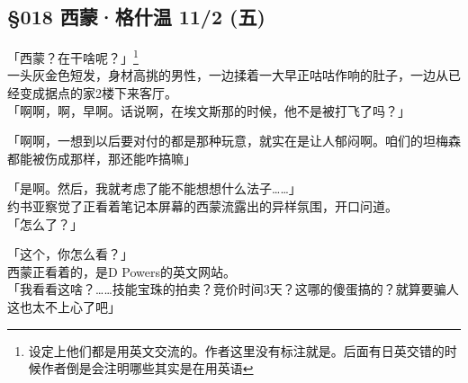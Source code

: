 \subsection{§018 西蒙·格什温 11/2 (五)}

「西蒙？在干啥呢？」\footnote{设定上他们都是用英文交流的。作者这里没有标注就是。后面有日英交错的时候作者倒是会注明哪些其实是在用英语}\\

一头灰金色短发，身材高挑的男性，一边揉着一大早正咕咕作响的肚子，一边从已经变成据点的家2楼下来客厅。\\

「啊啊，啊，早啊。话说啊，在埃文斯那的时候，他不是被打飞了吗？」

「啊啊，一想到以后要对付的都是那种玩意，就实在是让人郁闷啊。咱们的坦梅森都能被伤成那样，那还能咋搞嘛」

「是啊。然后，我就考虑了能不能想想什么法子……」\\

约书亚察觉了正看着笔记本屏幕的西蒙流露出的异样氛围，开口问道。\\

「怎么了？」

「这个，你怎么看？」\\

西蒙正看着的，是D Powers的英文网站。\\

「我看看这啥？……技能宝珠的拍卖？竞价时间3天？这哪的傻蛋搞的？就算要骗人这也太不上心了吧」\\

